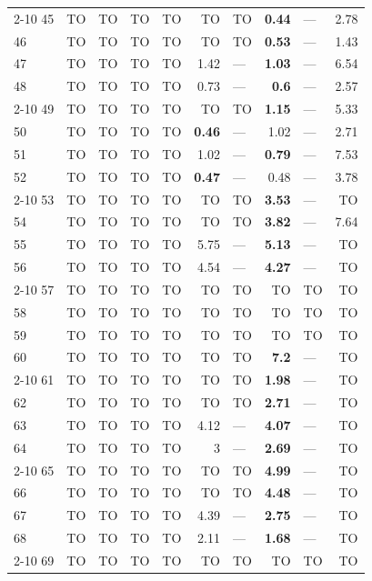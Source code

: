 \begin{longtable}{lr@{\hskip 4pt}l@{\hskip 12pt}r@{\hskip 4pt}l@{\hskip 12pt}r@{\hskip 4pt}l@{\hskip 12pt}r@{\hskip 4pt}l@{\hskip 12pt}r}
\cmidrule{2-10}
45 & TO & TO & TO & TO & TO & TO & \textbf{0.44} & --- & 2.78 \\
46 & TO & TO & TO & TO & TO & TO & \textbf{0.53} & --- & 1.43 \\
47 & TO & TO & TO & TO & 1.42 & --- & \textbf{1.03} & --- & 6.54 \\
48 & TO & TO & TO & TO & 0.73 & --- & \textbf{0.6} & --- & 2.57 \\
\cmidrule{2-10}
49 & TO & TO & TO & TO & TO & TO & \textbf{1.15} & --- & 5.33 \\
50 & TO & TO & TO & TO & \textbf{0.46} & --- & 1.02 & --- & 2.71 \\
51 & TO & TO & TO & TO & 1.02 & --- & \textbf{0.79} & --- & 7.53 \\
52 & TO & TO & TO & TO & \textbf{0.47} & --- & 0.48 & --- & 3.78 \\
\cmidrule{2-10}
53 & TO & TO & TO & TO & TO & TO & \textbf{3.53} & --- & TO \\
54 & TO & TO & TO & TO & TO & TO & \textbf{3.82} & --- & 7.64 \\
55 & TO & TO & TO & TO & 5.75 & --- & \textbf{5.13} & --- & TO \\
56 & TO & TO & TO & TO & 4.54 & --- & \textbf{4.27} & --- & TO \\
\cmidrule{2-10}
57 & TO & TO & TO & TO & TO & TO & TO & TO & TO \\
58 & TO & TO & TO & TO & TO & TO & TO & TO & TO \\
59 & TO & TO & TO & TO & TO & TO & TO & TO & TO \\
60 & TO & TO & TO & TO & TO & TO & \textbf{7.2} & --- & TO \\
\cmidrule{2-10}
61 & TO & TO & TO & TO & TO & TO & \textbf{1.98} & --- & TO \\
62 & TO & TO & TO & TO & TO & TO & \textbf{2.71} & --- & TO \\
63 & TO & TO & TO & TO & 4.12 & --- & \textbf{4.07} & --- & TO \\
64 & TO & TO & TO & TO & 3 & --- & \textbf{2.69} & --- & TO \\
\cmidrule{2-10}
65 & TO & TO & TO & TO & TO & TO & \textbf{4.99} & --- & TO \\
66 & TO & TO & TO & TO & TO & TO & \textbf{4.48} & --- & TO \\
67 & TO & TO & TO & TO & 4.39 & --- & \textbf{2.75} & --- & TO \\
68 & TO & TO & TO & TO & 2.11 & --- & \textbf{1.68} & --- & TO \\
\cmidrule{2-10}
69 & TO & TO & TO & TO & TO & TO & TO & TO & TO \\

\end{longtable}
